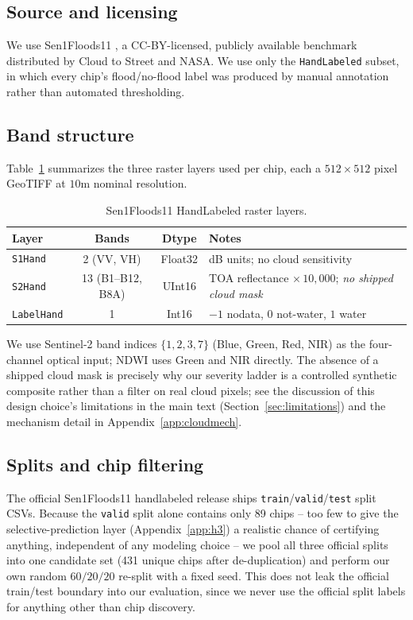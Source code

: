 \documentclass{article}
\begin{document}
\subsection{Source and licensing}
We use Sen1Floods11 \citep{bonafilia2020sen1floods11}, a CC-BY-licensed, publicly available benchmark distributed by Cloud to Street and NASA. We use only the \texttt{HandLabeled} subset, in which every chip's flood/no-flood label was produced by manual annotation rather than automated thresholding.

\subsection{Band structure}
Table~\ref{tab:bands} summarizes the three raster layers used per chip, each a $512\times512$ pixel GeoTIFF at $10$m nominal resolution.

\begin{table}[h]
\centering
\caption{Sen1Floods11 HandLabeled raster layers.}
\label{tab:bands}
\begin{tabular}{lccl}
\toprule
Layer & Bands & Dtype & Notes \\
\midrule
\texttt{S1Hand} & 2 (VV, VH) & Float32 & dB units; no cloud sensitivity \\
\texttt{S2Hand} & 13 (B1--B12, B8A) & UInt16 & TOA reflectance $\times\,10{,}000$; \emph{no shipped cloud mask} \\
\texttt{LabelHand} & 1 & Int16 & $-1$ nodata, $0$ not-water, $1$ water \\
\bottomrule
\end{tabular}
\end{table}

We use Sentinel-2 band indices $\{1,2,3,7\}$ (Blue, Green, Red, NIR) as the four-channel optical input; NDWI uses Green and NIR directly. The absence of a shipped cloud mask is precisely why our severity ladder is a controlled synthetic composite rather than a filter on real cloud pixels; see the discussion of this design choice's limitations in the main text (Section~\ref{sec:limitations}) and the mechanism detail in Appendix~\ref{app:cloudmech}.

\subsection{Splits and chip filtering}
The official Sen1Floods11 handlabeled release ships \texttt{train}/\texttt{valid}/\texttt{test} split CSVs. Because the \texttt{valid} split alone contains only 89 chips -- too few to give the selective-prediction layer (Appendix~\ref{app:h3}) a realistic chance of certifying anything, independent of any modeling choice -- we pool all three official splits into one candidate set (431 unique chips after de-duplication) and perform our own random $60/20/20$ re-split with a fixed seed. This does not leak the official train/test boundary into our evaluation, since we never use the official split labels for anything other than chip discovery.
\end{document}
